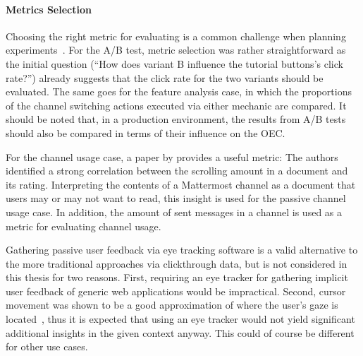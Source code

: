 \paragraph{Metrics Selection}

Choosing the right metric for evaluating is a common challenge when planning experiments~\cite{lindgren2015software}.
For the A/B test, metric selection was rather straightforward as the initial question (``How does variant B influence the tutorial buttons's click rate?'') already suggests that the click rate for the two variants should be evaluated.
The same goes for the feature analysis case, in which the proportions of the channel switching actions executed via either mechanic are compared.
It should be noted that, in a production environment, the results from A/B tests should also be compared in terms of their influence on the \acf{OEC}.

For the channel usage case, a paper by \citet{Claypool2001} provides a useful metric: The authors identified a strong correlation between the scrolling amount in a document and its rating.
Interpreting the contents of a Mattermost channel as a document that users may or may not want to read, this insight is used for the passive channel usage case.
In addition, the amount of sent messages in a channel is used as a metric for evaluating channel usage.

Gathering passive user feedback via eye tracking software is a valid alternative to the more traditional approaches via clickthrough data, but is not considered in this thesis for two reasons.
First, requiring an eye tracker for gathering implicit user feedback of generic web applications would be impractical.
Second, cursor movement was shown to be a good approximation of where the user's gaze is located~\cite{Huang2011}, thus it is expected that using an eye tracker would not yield significant additional insights in the given context anyway.
This could of course be different for other use cases.




